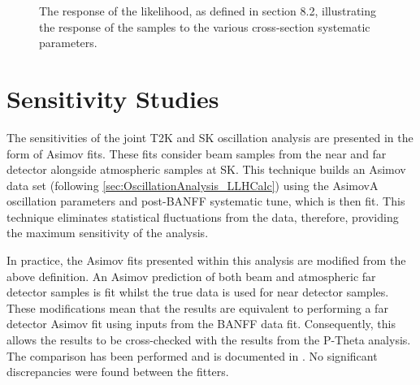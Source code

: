 \begin{figure}[h]
\begin{subfigure}[t]{0.5\textwidth}
  \end{subfigure}
  \caption{The response of the likelihood, as defined in section 8.2, illustrating the response of the samples to the various cross-section systematic parameters.}
  \label{fig:OscillationAnalysis_LLHScanSystPars}
\end{figure}

\clearpage
\section{Sensitivity Studies}
\label{sec:OscillationAnalysis_Sensitivities}

The sensitivities of the joint T2K and SK oscillation analysis are presented in the form of Asimov fits. These fits consider beam samples from the near and far detector alongside atmospheric samples at SK. This technique builds an Asimov data set (following \autoref{sec:OscillationAnalysis_LLHCalc}) using the AsimovA oscillation parameters and post-BANFF systematic tune, which is then fit. This technique eliminates statistical fluctuations from the data, therefore, providing the maximum sensitivity of the analysis.

In practice, the Asimov fits presented within this analysis are modified from the above definition. An Asimov prediction of both beam and atmospheric far detector samples is fit whilst the true data is used for near detector samples.
These modifications mean that the results are equivalent to performing a far detector Asimov fit using inputs from the BANFF data fit. Consequently, this allows the results to be cross-checked with the results from the P-Theta analysis. The comparison has been performed and is documented in \cite{barrow_M3_PT_Comp}. No significant discrepancies were found between the fitters.

